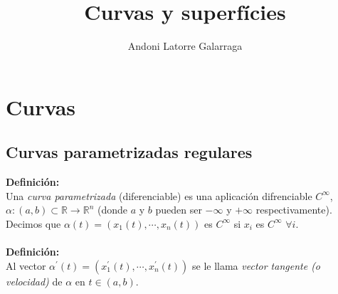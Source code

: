 \documentclass{article}
\title{Curvas y superfícies}
\author{Andoni Latorre Galarraga}
\date{}
\begin{document}
\setlength{\parindent}{0cm}
\newcommand{\norma}[1]{\left\|#1\right\|}
\maketitle

\section{Curvas}

\subsection{Curvas parametrizadas regulares}


\textbf{Definición:}\\
Una \textit{curva parametrizada} (diferenciable) es una aplicación difrenciable $C^\infty$, $\alpha:(a,b)\subset\mathbb{R}\longrightarrow\mathbb{R}^n$ (donde $a$ y $b$ pueden ser $-\infty$ y $+\infty$ respectivamente). Decimos que $\alpha(t)=(x_1(t),\cdots,x_n(t))$ es $C^\infty$ si $x_i$ es $C^\infty$ $\forall i$.\\\\


\textbf{Definición:}\\
Al vector $\alpha^\prime(t)=(x_1^\prime(t),\cdots,x_n^\prime(t))$ se le llama \textit{vector tangente (o velocidad)} de $\alpha$ en $t\in(a,b)$.\\\\

\end{document}
